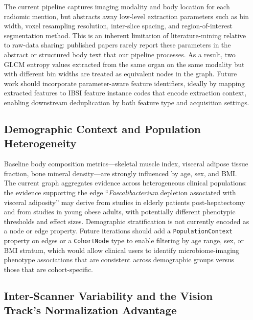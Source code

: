 \documentclass[12pt, letterpaper]{article}
\begin{document}
The current pipeline captures imaging modality and body location for each radiomic mention, but abstracts away low-level extraction parameters such as bin width, voxel resampling resolution, inter-slice spacing, and region-of-interest segmentation method. This is an inherent limitation of literature-mining relative to raw-data sharing: published papers rarely report these parameters in the abstract or structured body text that our pipeline processes. As a result, two GLCM entropy values extracted from the same organ on the same modality but with different bin widths are treated as equivalent nodes in the graph. Future work should incorporate parameter-aware feature identifiers, ideally by mapping extracted features to IBSI feature instance codes that encode extraction context, enabling downstream deduplication by both feature type and acquisition settings.

\subsection{Demographic Context and Population Heterogeneity}

Baseline body composition metrics—skeletal muscle index, visceral adipose tissue fraction, bone mineral density—are strongly influenced by age, sex, and BMI. The current graph aggregates evidence across heterogeneous clinical populations: the evidence supporting the edge ``\textit{Faecalibacterium} depletion associated with visceral adiposity'' may derive from studies in elderly patients post-hepatectomy and from studies in young obese adults, with potentially different phenotypic thresholds and effect sizes. Demographic stratification is not currently encoded as a node or edge property. Future iterations should add a \texttt{PopulationContext} property on edges or a \texttt{CohortNode} type to enable filtering by age range, sex, or BMI stratum, which would allow clinical users to identify microbiome-imaging phenotype associations that are consistent across demographic groups versus those that are cohort-specific.

\subsection{Inter-Scanner Variability and the Vision Track's Normalization Advantage}
\end{document}
